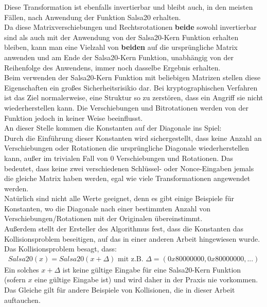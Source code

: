 \documentclass[course=erap]{aspdoc}
\begin{document}
Diese Transformation ist ebenfalls invertierbar und bleibt auch, in den meisten Fällen, nach Anwendung der Funktion Salsa20 erhalten.\cite{salsa20security}
\vspace{1mm}
\\Da diese Matrixverschiebungen und Rechtsrotationen \textbf{beide} sowohl invertierbar sind als auch mit der Anwendung von der Salsa20-Kern Funktion erhalten bleiben, 
kann man eine Vielzahl von \textbf{beiden} auf die ursprüngliche Matrix anwenden und am Ende der Salsa20-Kern Funktion, unabhängig von der Reihenfolge des Anwendens, immer noch dasselbe Ergebnis erhalten.
\vspace{1mm}
\\Beim verwenden der Salsa20-Kern Funktion mit beliebigen Matrizen stellen diese Eigenschaften ein großes Sicherheitsrisikio dar. 
Bei kryptographischen Verfahren ist das Ziel normalerweise, eine Struktur so zu zerstören, dass ein Angriff sie nicht wiederherstellen kann. 
Die Verschiebungen und Bitrotationen werden von der Funktion jedoch in keiner Weise beeinflusst.
\vspace{1mm}
\\An dieser Stelle kommen die Konstanten auf der Diagonale ins Spiel:
\vspace{2mm}
\\Durch die Einführung dieser Konstanten wird sichergestellt, dass keine Anzahl an Verschiebungen oder Rotationen die ursprüngliche Diagonale wiederherstellen kann, 
außer im trivialen Fall von 0 Verschiebungen und Rotationen. Das bedeutet, dass keine zwei verschiedenen Schlüssel- oder Nonce-Eingaben 
jemals die gleiche Matrix haben werden, egal wie viele Transformationen angewendet werden.\cite{salsa20security}
\vspace{1mm}
\\Natürlich sind nicht alle Werte geeignet, denn es gibt einige Beispiele für Konstanten, 
wo die Diagonale nach einer bestimmten Anzahl von Verschiebungen/Rotationen mit der Originalen übereinstimmt.
\vspace{1mm}
\\Außerdem stellt der Ersteller des Algorithmus fest\cite{ResponseOnTheSalsa20Core}, dass die Konstanten das Kollisionsproblem beseitigen, 
auf das in einer anderen Arbeit\cite{onTheSalsa20Core} hingewiesen wurde.\\
Das Kollisionsproblem besagt, dass:
\begin{gather*} Salsa20(x) = Salsa20(x + \Delta) \text{  mit z.B.  } \Delta=(0x80000000,0x80000000,...) \end{gather*} 
Ein solches $x+\Delta$ ist keine gültige Eingabe für eine Salsa20-Kern Funktion (sofern $x$ eine gültige Eingabe ist) und wird daher in der Praxis nie vorkommen. 
Das Gleiche gilt für andere Beispiele von Kollisionen, die in dieser Arbeit auftauchen.
\end{document}
